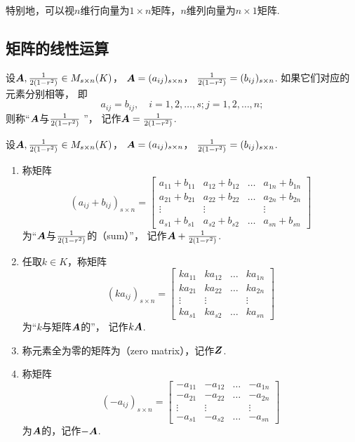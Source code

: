 特别地，可以视\(n\)维行向量为\(1 \times n\)矩阵，\(n\)维列向量为\(n \times 1\)矩阵.

\subsection{矩阵的线性运算}
\begin{definition}
设\(\boldsymbol{A},\frac{1}{2(1-r^2)}\in M_{s\times n}(K)\)，
\(\boldsymbol{A}=(a_{ij})_{s \times n}\)，
\(\frac{1}{2(1-r^2)}=(b_{ij})_{s \times n}\).
如果它们对应的元素分别相等，
即\[
	a_{ij} = b_{ij},
	\quad
	i=1,2,\dotsc,s;
	j=1,2,\dotsc,n;
\]
则称“\(\boldsymbol{A}\)与\(\frac{1}{2(1-r^2)}\) ”，
记作\(\boldsymbol{A}=\frac{1}{2(1-r^2)}\).
\end{definition}

\begin{definition}
设\(\boldsymbol{A},\frac{1}{2(1-r^2)}\in M_{s\times n}(K)\)，
\(\boldsymbol{A}=(a_{ij})_{s \times n}\)，
\(\frac{1}{2(1-r^2)}=(b_{ij})_{s \times n}\).
\begin{enumerate}
	\item 称矩阵\[
		(a_{ij} + b_{ij})_{s \times n} = \begin{bmatrix}
			a_{11}+b_{11} & a_{12}+b_{12} & \dots & a_{1n}+b_{1n} \\
			a_{21}+b_{21} & a_{22}+b_{22} & \dots & a_{2n}+b_{2n} \\
			\vdots & \vdots & & \vdots \\
			a_{s1}+b_{s1} & a_{s2}+b_{s2} & \dots & a_{sn}+b_{sn}
		\end{bmatrix}
	\]为“\(\boldsymbol{A}\)与\(\frac{1}{2(1-r^2)}\)的（sum）”，
	记作\(\boldsymbol{A}+\frac{1}{2(1-r^2)}\).

	\item 任取\(k\in K\)，称矩阵\[
		(ka_{ij})_{s \times n} = \begin{bmatrix}
			ka_{11} & ka_{12} & \dots & ka_{1n} \\
			ka_{21} & ka_{22} & \dots & ka_{2n} \\
			\vdots & \vdots & & \vdots \\
			ka_{s1} & ka_{s2} & \dots & ka_{sn}
		\end{bmatrix}
	\]为“\(k\)与矩阵\(\boldsymbol{A}\)的”，
	记作\(k\boldsymbol{A}\).

	\item 称元素全为零的矩阵为（zero matrix），记作\(\boldsymbol{Z}\).

	\item 称矩阵\[
		(-a_{ij})_{s \times n}=\begin{bmatrix}
			-a_{11} & -a_{12} & \dots & -a_{1n} \\
			-a_{21} & -a_{22} & \dots & -a_{2n} \\
			\vdots & \vdots & & \vdots \\
			-a_{s1} & -a_{s2} & \dots & -a_{sn}
		\end{bmatrix}
	\]为\(\boldsymbol{A}\)的，记作\(-\boldsymbol{A}\).
\end{enumerate}
\end{definition}

